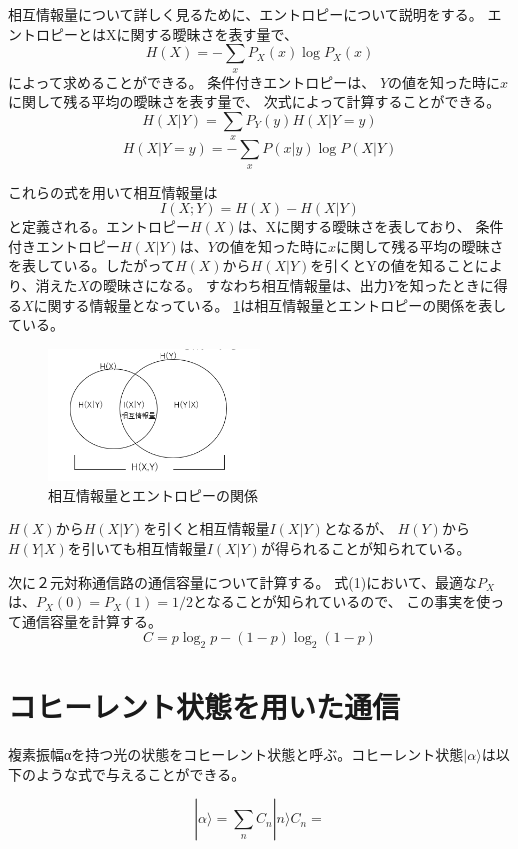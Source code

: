 \documentclass[a4j,twocolumn]{jarticle}
\def \figref #1{\figurename\ref{#1}}
\begin{document}
相互情報量について詳しく見るために、エントロピーについて説明をする。
エントロピーとはXに関する曖昧さを表す量で、
$$
H(X)=-\sum_xP_X(x)\log P_X(x)
$$
によって求めることができる。
条件付きエントロピーは、
$Y$の値を知った時に$x$に関して残る平均の曖昧さを表す量で、
次式によって計算することができる。
$$
H(X|Y)=\sum_xP_Y(y)H(X|Y=y)$$
$$
H(X|Y=y)=-\sum_xP(x|y)\log P(X|Y)
$$




これらの式を用いて相互情報量は
$$
I(X;Y)=H(X)-H(X|Y)
$$
と定義される。エントロピー$H(X)$は、Xに関する曖昧さを表しており、
条件付きエントロピー$H(X|Y)$は、$Y$の値を知った時に$x$に関して残る平均の曖昧さ
を表している。したがって$H(X)$から$H(X|Y)$を引くとYの値を知ることにより、消えた$X$の曖昧さになる。
すなわち相互情報量は、出力$Y$を知ったときに得る$X$に関する情報量となっている。
\figref{Fig3_1}は相互情報量とエントロピーの関係を表している。


    \begin{figure}[H]
        \centering   
        \includegraphics[width=0.5\textwidth]{img/Fig2.png}
        \caption[sample image (png)]{相互情報量とエントロピーの関係}
        \label{Fig3_1}
    \end{figure}


$H(X)$から$H(X|Y)$を引くと相互情報量$I(X|Y)$となるが、
$H(Y)$から$H(Y|X)$を引いても相互情報量$I(X|Y)$が得られることが知られている。


次に２元対称通信路の通信容量について計算する。
式(1)において、最適な$P_X$は、$P_X(0)=P_X(1)=1/2$となることが知られているので、
この事実を使って通信容量を計算する。
$$
C=p\log_2p-(1-p)\log_2(1-p)
$$

\section{コヒーレント状態を用いた通信}
複素振幅αを持つ光の状態をコヒーレント状態と呼ぶ。コヒーレント状態$|\alpha\rangle$は以下のような式で与えることができる。

\begin{equation}
|\alpha\rangle=\sum_nC_n|n\rangle 
C_n=
\end{equation}
\end{document}
